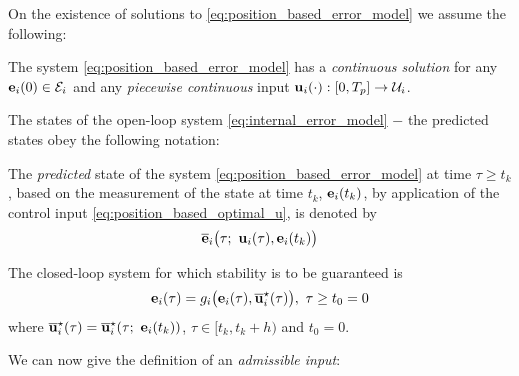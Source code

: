 On the existence of solutions to \eqref{eq:position_based_error_model} we
assume the following:
\begin{bw_box}
\begin{assumption}
  \label{ass:existence_of_solutions_without_disturbance}

  The system \eqref{eq:position_based_error_model} has a
  \textit{continuous solution} for any $\bm{\mathbf{e}}_i(0) \in \mathcal{E}_i$ and
  any \textit{piecewise continuous} input
  $\bm{\mathbf{u}}_i(\cdot) :[0,T_p] \to \mathcal{U}_i$.
\end{assumption}
\end{bw_box}

The states of the open-loop system \eqref{eq:internal_error_model} $-$ the
predicted states obey the following notation:
\begin{bw_box}
\begin{remark}
The \textit{predicted} state of the system \eqref{eq:position_based_error_model}
at time $\tau \geq t_k$ , based on the measurement of the state at time
$t_k$, $\bm{\mathbf{e}}_i(t_k)$, by application of the control input
\eqref{eq:position_based_optimal_u}, is denoted by
\begin{align}
  \overline{\bm{\mathbf{e}}}_i\big(\tau;\ \bm{\mathbf{u}}_i(\tau), \bm{\mathbf{e}}_i(t_k)\big) \label{eq:position_based_predicted_error_0}
\end{align}
\end{remark}
\end{bw_box}

The closed-loop system for which stability is to be guaranteed is
\begin{align}
  \bm{\mathbf{e}}_i(\tau) = g_i\big(\bm{\mathbf{e}}_i(\tau), \overline{\bm{\mathbf{u}}}_i^{\star}(\tau)\big),\ \tau \geq t_0 = 0
  \label{eq:without_disturbances_closed_loop}
\end{align}
where $\overline{\bm{\mathbf{u}}}_i^{\star}(\tau) = \overline{\bm{\mathbf{u}}}_i^{\star}(\tau;\ \bm{\mathbf{e}}_i(t_k))$,
$\tau \in [t_k, t_k + h)$ and $t_0 = 0$.


We can now give the definition of an \textit{admissible input}:

